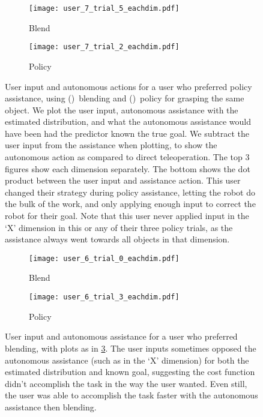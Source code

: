 \begin{figure}[t]
  \centering
  \begin{subfigure}{0.233\textwidth}
    \centering 
    \texttt{[image: user\_7\_trial\_5\_eachdim.pdf]}
    \caption{Blend}
    \label{fig:user7_blend}
  \end{subfigure}
  \hfill
  \begin{subfigure}{0.233\textwidth}
    \centering 
    \texttt{[image: user\_7\_trial\_2\_eachdim.pdf]}
    \caption{Policy}
    \label{fig:user7_policy}
  \end{subfigure}
  \hfill
  \caption{User input and autonomous actions for a user who preferred policy assistance, using ()~blending and ()~policy for grasping the same object. We plot the user input, autonomous assistance with the estimated distribution, and what the autonomous assistance would have been had the predictor known the true goal. We subtract the user input from the assistance when plotting, to show the autonomous action as compared to direct teleoperation. The top 3 figures show each dimension separately. The bottom shows the dot product between the user input and assistance action. This user changed their strategy during policy assistance, letting the robot do the bulk of the work, and only applying enough input to correct the robot for their goal. Note that this user never applied input in the `X' dimension in this or any of their three policy trials, as the assistance always went towards all objects in that dimension.}
  \label{fig:user7}
\end{figure}

\begin{figure}[t]
  \centering
  \hfill
  \begin{subfigure}{0.233\textwidth}
    \centering 
    \texttt{[image: user\_6\_trial\_0\_eachdim.pdf]}
    \caption{Blend}
    \label{fig:user6_blend}
  \end{subfigure}
  \hfill
  \begin{subfigure}{0.233\textwidth}
    \centering 
    \texttt{[image: user\_6\_trial\_3\_eachdim.pdf]}
    \caption{Policy}
    \label{fig:user6_policy}
  \end{subfigure}
  \caption{User input and autonomous assistance for a user who preferred blending, with plots as in \cref{fig:user7}. The user inputs sometimes opposed the autonomous assistance (such as in the `X' dimension) for both the estimated distribution and known goal, suggesting the cost function didn't accomplish the task in the way the user wanted. Even still, the user was able to accomplish the task faster with the autonomous assistance then blending. }
  \label{fig:user6}
\end{figure}


